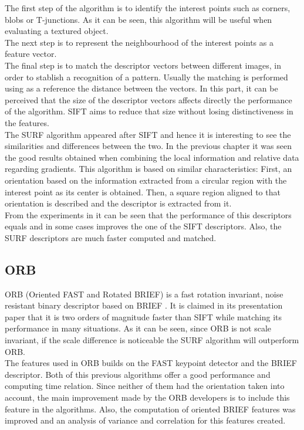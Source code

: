 The first step of the algorithm is to identify the interest points such as corners, blobs or T-junctions. As it can be seen, this algorithm will be useful when evaluating a textured object. 
\\

The next step is to represent the neighbourhood of the interest points as a feature vector. 
\\

The final step is to match the descriptor vectors between different images, in order to stablish a recognition of a pattern. Usually the matching is performed using as a reference the distance between the vectors. 
In this part, it can be perceived that the size of the descriptor vectors affects directly the performance of the algorithm. SIFT aims to reduce that size without losing distinctiveness in the features. 
\\

The SURF algorithm appeared after SIFT and hence it is interesting to see the similarities and differences between the two. In the previous chapter it was seen the good results obtained when combining the local information and relative data regarding gradients. This algorithm is based on similar characteristics: 
First, an orientation based on the information extracted from a circular region with the interest point as its center is obtained. Then, a square region aligned to that orientation is described and the descriptor is extracted from it.  
\\

From the experiments in \cite{surf} it can be seen that the performance of this descriptors equals and in some cases improves the one of the SIFT descriptors. Also, the SURF descriptors are much faster computed and matched. 


\subsection{ORB}
ORB (Oriented FAST and Rotated BRIEF) is a fast rotation invariant, noise resistant binary descriptor based on BRIEF \cite{orb}.
It is claimed in its presentation paper that it is two orders of magnitude faster than SIFT while matching its performance in many situations. As it can be seen, since ORB is not scale invariant, if the scale difference is noticeable the SURF algorithm will outperform ORB. 
\\

The features used in ORB builds on the FAST\cite{fast} keypoint detector and the BRIEF\cite{brief} descriptor. Both of this previous algorithms offer a good performance and computing time relation. Since neither of them had the orientation taken into account, the main improvement made by the ORB developers is to include this feature in the algorithms. Also, the computation of oriented BRIEF features was improved and an analysis of variance and correlation for this features created. 
\\

